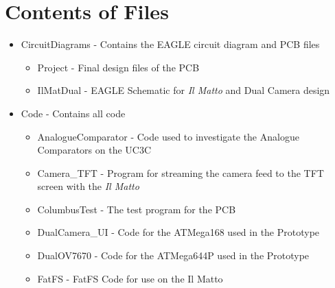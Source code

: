 \chapter{Contents of Files} \label{Appendix:Contents}
\begin{itemize}
\item CircuitDiagrams - Contains the EAGLE circuit diagram and PCB files
\begin{itemize}
\item Project - Final design files of the PCB
\item IlMatDual - EAGLE Schematic for \textit{Il Matto} and Dual Camera design
\end{itemize}
\item Code - Contains all code
\begin{itemize}
\item AnalogueComparator - Code used to investigate the Analogue Comparators on the UC3C
\item Camera\_TFT - Program for streaming the camera feed to the TFT screen with the \textit{Il Matto}
\item ColumbusTest - The test program for the PCB
\item DualCamera\_UI - Code for the ATMega168 used in the Prototype
\item DualOV7670 - Code for the ATMega644P used in the Prototype
\item FatFS - FatFS Code for use on the Il Matto 

\end{itemize}
\end{itemize}
